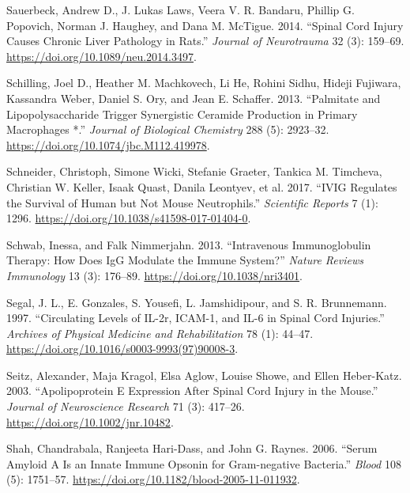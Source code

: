 \documentclass[9pt,lineno]{elife}
\newlength{\cslhangindent}
\newlength{\cslentryspacingunit} %
\newenvironment{CSLReferences}[2] %
 {%
  \setlength{\parindent}{0pt}
  \ifodd #1
  \let\oldpar\par
  \def\par{\hangindent=\cslhangindent\oldpar}
  \fi
  \setlength{\parskip}{#2\cslentryspacingunit}
 }%
 {}
\begin{document}
\begin{CSLReferences}{1}{0}
\leavevmode{}%
Sauerbeck, Andrew D., J. Lukas Laws, Veera V. R. Bandaru, Phillip G. Popovich, Norman J. Haughey, and Dana M. McTigue. 2014. {``Spinal {Cord Injury Causes Chronic Liver Pathology} in {Rats}.''} \emph{Journal of Neurotrauma} 32 (3): 159--69. \url{https://doi.org/10.1089/neu.2014.3497}.

\leavevmode{}%
Schilling, Joel D., Heather M. Machkovech, Li He, Rohini Sidhu, Hideji Fujiwara, Kassandra Weber, Daniel S. Ory, and Jean E. Schaffer. 2013. {``Palmitate and {Lipopolysaccharide Trigger Synergistic Ceramide Production} in {Primary Macrophages} *.''} \emph{Journal of Biological Chemistry} 288 (5): 2923--32. \url{https://doi.org/10.1074/jbc.M112.419978}.

\leavevmode{}%
Schneider, Christoph, Simone Wicki, Stefanie Graeter, Tankica M. Timcheva, Christian W. Keller, Isaak Quast, Danila Leontyev, et al. 2017. {``{IVIG} Regulates the Survival of Human but Not Mouse Neutrophils.''} \emph{Scientific Reports} 7 (1): 1296. \url{https://doi.org/10.1038/s41598-017-01404-0}.

\leavevmode{}%
Schwab, Inessa, and Falk Nimmerjahn. 2013. {``Intravenous Immunoglobulin Therapy: How Does {IgG} Modulate the Immune System?''} \emph{Nature Reviews Immunology} 13 (3): 176--89. \url{https://doi.org/10.1038/nri3401}.

\leavevmode{}%
Segal, J. L., E. Gonzales, S. Yousefi, L. Jamshidipour, and S. R. Brunnemann. 1997. {``Circulating Levels of {IL-2r}, {ICAM-1}, and {IL-6} in Spinal Cord Injuries.''} \emph{Archives of Physical Medicine and Rehabilitation} 78 (1): 44--47. \url{https://doi.org/10.1016/s0003-9993(97)90008-3}.

\leavevmode{}%
Seitz, Alexander, Maja Kragol, Elsa Aglow, Louise Showe, and Ellen Heber-Katz. 2003. {``Apolipoprotein {E} Expression After Spinal Cord Injury in the Mouse.''} \emph{Journal of Neuroscience Research} 71 (3): 417--26. \url{https://doi.org/10.1002/jnr.10482}.

\leavevmode{}%
Shah, Chandrabala, Ranjeeta Hari-Dass, and John G. Raynes. 2006. {``Serum Amyloid {A} Is an Innate Immune Opsonin for {Gram-negative} Bacteria.''} \emph{Blood} 108 (5): 1751--57. \url{https://doi.org/10.1182/blood-2005-11-011932}.


\end{CSLReferences}
\end{document}
